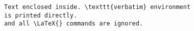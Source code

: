 \begin{verbatim}
Text enclosed inside. \texttt{verbatim} environment 
is printed directly. 
and all \LaTeX{} commands are ignored.
\end{verbatim}